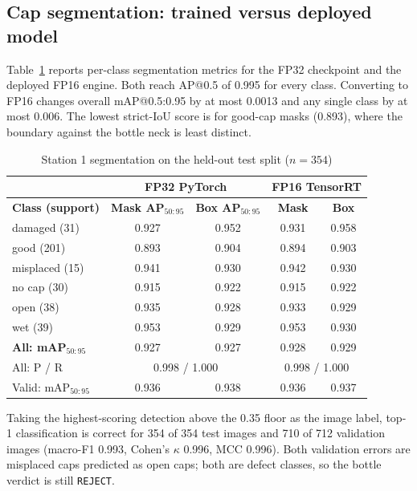 \subsection{Cap segmentation: trained versus deployed model}
\label{sec:res-seg}
Table~\ref{tab:seg} reports per-class segmentation metrics for the FP32 checkpoint and the deployed FP16 engine. Both reach AP@0.5 of 0.995 for every class. Converting to FP16 changes overall mAP@0.5:0.95 by at most 0.0013 and any single class by at most 0.006. The lowest strict-IoU score is for good-cap masks (0.893), where the boundary against the bottle neck is least distinct.

\begin{table}[htbp]
\centering
\caption{Station 1 segmentation on the held-out test split ($n=354$)}
\label{tab:seg}
\footnotesize
\begin{tabular}{|l|c|c|c|c|}
\hline
 & \multicolumn{2}{c|}{\textbf{FP32 PyTorch}} & \multicolumn{2}{c|}{\textbf{FP16 TensorRT}} \\ \hline
\textbf{Class (support)} & \textbf{Mask AP$_{50:95}$} & \textbf{Box AP$_{50:95}$} & \textbf{Mask} & \textbf{Box} \\ \hline
damaged (31) & 0.927 & 0.952 & 0.931 & 0.958 \\ \hline
good (201) & 0.893 & 0.904 & 0.894 & 0.903 \\ \hline
misplaced (15) & 0.941 & 0.930 & 0.942 & 0.930 \\ \hline
no cap (30) & 0.915 & 0.922 & 0.915 & 0.922 \\ \hline
open (38) & 0.935 & 0.928 & 0.933 & 0.929 \\ \hline
wet (39) & 0.953 & 0.929 & 0.953 & 0.930 \\ \hline
\textbf{All: mAP$_{50:95}$} & 0.927 & 0.927 & 0.928 & 0.929 \\ \hline
All: P / R & \multicolumn{2}{c|}{0.998 / 1.000} & \multicolumn{2}{c|}{0.998 / 1.000} \\ \hline
Valid: mAP$_{50:95}$ & 0.936 & 0.938 & 0.936 & 0.937 \\ \hline
\end{tabular}
\end{table}

Taking the highest-scoring detection above the 0.35 floor as the image label, top-1 classification is correct for 354 of 354 test images and 710 of 712 validation images (macro-F1 0.993, Cohen's $\kappa$ 0.996, MCC 0.996). Both validation errors are misplaced caps predicted as open caps; both are defect classes, so the bottle verdict is still \texttt{REJECT}.

